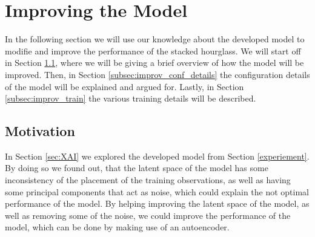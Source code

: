 \documentclass[./main.tex]{subfiles}
\begin{document}
\section{Improving the Model}\label{sec:improving}
In the following section we will use our knowledge about the developed model to modifie and improve the performance of the stacked hourglass. We will start off in Section \ref{subsec:improv_motivation}, where we will be giving a brief overview of how the model will be improved. Then, in Section \ref{subsec:improv_conf_details} the configuration details of the model will be explained and argued for. Lastly, in Section \ref{subsec:improv_train} the various training details will be described.

\subsection{Motivation}\label{subsec:improv_motivation}
In Section \ref{sec:XAI} we explored the developed model from Section \ref{experiement}. By doing so we found out, that the latent space of the model has some inconsistency of the placement of the training observations, as well as having some principal components that act as noise, which could explain the not optimal performance of the model. By helping improving the latent space of the model, as well as removing some of the noise, we could improve the performance of the model, which can be done by making use of an autoencoder.
\end{document}
